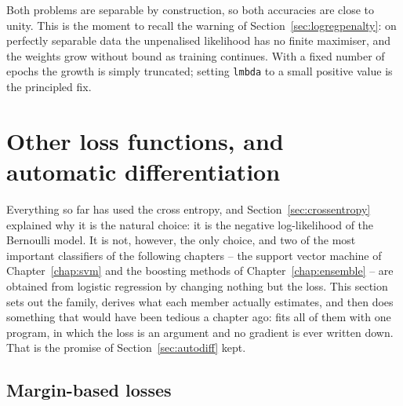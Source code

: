 Both problems are separable by construction, so both accuracies are close to
unity.  This is the moment to recall the warning of
Section~\ref{sec:logregpenalty}: on perfectly separable data the unpenalised
likelihood has no finite maximiser, and the weights grow without bound as
training continues.  With a fixed number of epochs the growth is simply
truncated; setting \texttt{lmbda} to a small positive value is the principled
fix.

\section{Other loss functions, and automatic differentiation}
\label{sec:logreglosses}

Everything so far has used the cross entropy, and Section~\ref{sec:crossentropy}
explained why it is the natural choice: it is the negative log-likelihood of
the Bernoulli model.  It is not, however, the only choice, and two of the most
important classifiers of the following chapters -- the support vector machine
of Chapter~\ref{chap:svm} and the boosting methods of
Chapter~\ref{chap:ensemble} -- are obtained from logistic regression by
changing nothing but the loss.  This section sets out the family, derives
what each member actually estimates, and then does something that would have
been tedious a chapter ago: fits all of them with one program, in which the
loss is an argument and no gradient is ever written down.  That is the
promise of Section~\ref{sec:autodiff} kept.

\subsection{Margin-based losses}
\label{sec:marginlosses}

